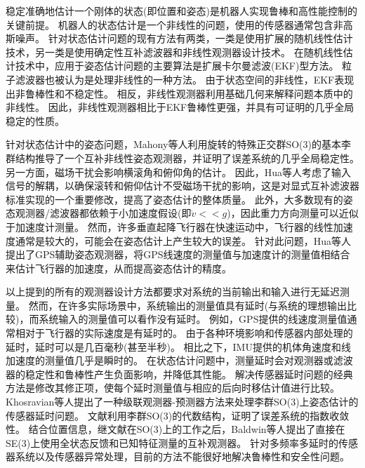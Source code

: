\documentclass[
  type=master
]{gdutthesis}
\begin{document}
稳定准确地估计一个刚体的状态(即位置和姿态)是机器人实现鲁棒和高性能控制的关键前提。
机器人的状态估计是一个非线性的问题，使用的传感器通常包含非高斯噪声\cite{chen2022nonparametric}。
针对状态估计问题的现有方法有两类，一类是使用扩展的随机线性估计技术\cite{bertsimas2022data,liu2022extended}，另一类是使用确定性互补滤波器和非线性观测器设计技术\cite{amor2022three,wang2022nonlinear,wang2022nonlinear}。
在随机线性估计技术中，应用于姿态估计问题的主要算法是扩展卡尔曼滤波(EKF)型方法。
粒子滤波器也被认为是处理非线性的一种方法\cite{wang2022particle}。
由于状态空间的非线性，EKF表现出非鲁棒性和不稳定性\cite{crassidis2007survey}。
相反，非线性观测器利用基础几何来解释问题本质中的非线性。
因此，非线性观测器相比于EKF鲁棒性更强，并具有可证明的几乎全局稳定的性质\cite{thienel2003coupled,mahony2008nonlinear,lageman2009gradient,hua2010attitude,vasconcelos2010nonlinear}。

针对状态估计中的姿态问题，Mahony等人利用旋转的特殊正交群SO(3)的基本李群结构推导了一个互补非线性姿态观测器，并证明了误差系统的几乎全局稳定性\cite{mahony2008nonlinear}。
另一方面，磁场干扰会影响横滚角和俯仰角的估计。
因此，Hua等人考虑了输入信号的解耦，以确保滚转和俯仰估计不受磁场干扰的影响，这是对显式互补滤波器标准实现的一个重要修改，提高了姿态估计的整体质量\cite{hua2011nonlinear}。
此外，大多数现有的姿态观测器/滤波器都依赖于小加速度假设(即$\dot{v}<<g$)，因此重力方向测量可以近似于加速度计测量。
然而，许多垂直起降飞行器在快速运动中，飞行器的线性加速度通常是较大的，可能会在姿态估计上产生较大的误差。
针对此问题，Hua等人提出了GPS辅助姿态观测器\cite{hua2010attitude}，将GPS线速度的测量值与加速度计的测量值相结合来估计飞行器的加速度，从而提高姿态估计的精度。

以上提到的所有的观测器设计方法都要求对系统的当前输出和输入进行无延迟测量。
然而，在许多实际场景中，系统输出的测量值具有延时(与系统的理想输出比较)，而系统输入的测量值可以看作没有延时。
例如，GPS提供的线速度测量值通常相对于飞行器的实际速度是有延时的。
由于各种环境影响和传感器内部处理的延时，延时可以是几百毫秒(甚至半秒)\cite{kingston2004real}。
相比之下，IMU提供的机体角速度和线加速度的测量值几乎是瞬时的。
在状态估计问题中，测量延时会对观测器或滤波器的稳定性和鲁棒性产生负面影响，并降低其性能\cite{battilotti2015nonlinear}。
解决传感器延时问题的经典方法是修改其修正项，使每个延时测量值与相应的后向时移估计值进行比较。
Khosravian等人提出了一种级联观测器-预测器方法来处理李群SO(3)上姿态估计的传感器延时问题\cite{khosravian2016state}。
文献\parencite{khosravian2016state}利用李群SO(3)的代数结构，证明了误差系统的指数收敛性。
结合位置信息，继文献\parencite{mahony2008nonlinear}在SO(3)上的工作之后，Baldwin等人提出了直接在SE(3)上使用全状态反馈和已知特征测量的互补观测器\cite{baldwin2007complementary}。
针对多频率多延时的传感器系统以及传感器异常处理，目前的方法不能很好地解决鲁棒性和安全性问题。
\end{document}
